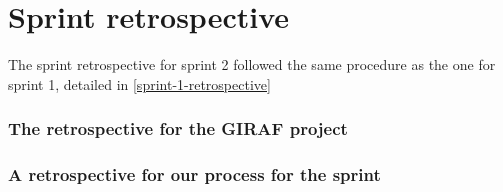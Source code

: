 \section{Sprint retrospective}
The sprint retrospective for sprint 2 followed the same procedure as the one for sprint 1, detailed in \autoref{sprint-1-retrospective}
\subsubsection{The retrospective for the GIRAF project}

\subsubsection{A retrospective for our process for the sprint}